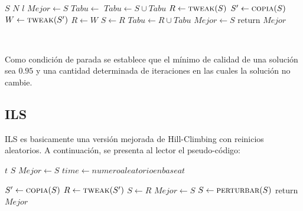 \documentclass[11pt]{article}
\begin{document}
    {\fontsize{9}{12}\selectfont
    \begin{algorithmic}
            \State $S$ 
            \State $N$ 
            \State $l$ 
            \State $Mejor \gets S$ 
            \State $Tabu \gets {}$  
            \State $Tabu \gets S \cup Tabu$ 
                    \State {}
                \EndIf
                \State $R \gets \Call{tweak}{S}$
                \State $S' \gets \Call{copia}{S}$
                \State $W \gets \Call{tweak}{S'}$
                    \State $R \gets W$
                \EndIf
            \EndFor
                \State $S \gets R$
                \State $Tabu \gets R \cup Tabu$ 
            \EndIf
                \State $Mejor \gets S$
            \EndIf
            \EndWhile
            \State return $Mejor$
        \EndFunction
    \end{algorithmic}
    }

    ~\ 

    Como condición de parada se establece que el mínimo de calidad de una solución sea $0.95$ y una cantidad determinada de iteraciones en las cuales la solución no cambie.

    \subsection{ILS}
    ILS es basicamente una versión mejorada de Hill-Climbing con reinicios aleatorios. A continuación, se presenta al lector el pseudo-código:


    {\fontsize{9}{12}\selectfont
    \begin{algorithmic}
            \State $t$ 
            \State $S$ 
            \State $Mejor \gets S$
                \State $time \gets numero aleatorio en base a t$

                    \State $S' \gets \Call{copia}{S}$
                    \State $R \gets \Call{tweak}{S'}$
                        \State $S \gets R$
                    \EndIf
                \EndWhile
                \State $Mejor \gets S$
            \EndIf
            \State $S \gets \Call{perturbar}{S}$
            \EndWhile
            \State return $Mejor$
        \EndFunction
    \end{algorithmic}
    }
\end{document}

